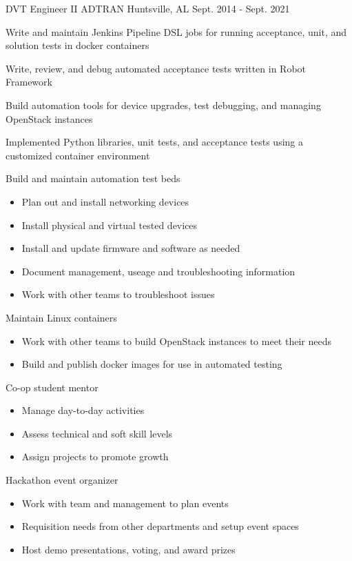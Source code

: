 \begin{cventries}
  \cventry
    {DVT Engineer II} %
    {ADTRAN} %
    {Huntsville, AL} %
    {Sept. 2014 - Sept. 2021} %
    {
      \begin{cvitems} %
        \item {Write and maintain Jenkins Pipeline DSL jobs for running acceptance, unit, and solution tests in docker containers}
        \item {Write, review, and debug automated acceptance tests written in Robot Framework}
        \item {Build automation tools for device upgrades, test debugging, and managing OpenStack instances}
        \item {Implemented Python libraries, unit tests, and acceptance tests using a customized container environment}
        \item {Build and maintain automation test beds}
            \begin{itemize}
                \item {Plan out and install networking devices}
                \item {Install physical and virtual tested devices}
                \item {Install and update firmware and software as needed}
                \item {Document management, useage and troubleshooting information}
                \item {Work with other teams to troubleshoot issues}
            \end{itemize}
        \item {Maintain Linux containers}
            \begin{itemize}
                \item {Work with other teams to build OpenStack instances to meet their needs}
                \item {Build and publish docker images for use in automated testing}
            \end{itemize}
        \item {Co-op student mentor}
            \begin{itemize}
                \item {Manage day-to-day activities}
                \item {Assess technical and soft skill levels}
                \item {Assign projects to promote growth}
            \end{itemize}
        \item {Hackathon event organizer}
            \begin{itemize}
                \item {Work with team and management to plan events}
                \item {Requisition needs from other departments and setup event spaces}
                \item {Host demo presentations, voting, and award prizes}
            \end{itemize}
      \end{cvitems}
    }


\end{cventries}
